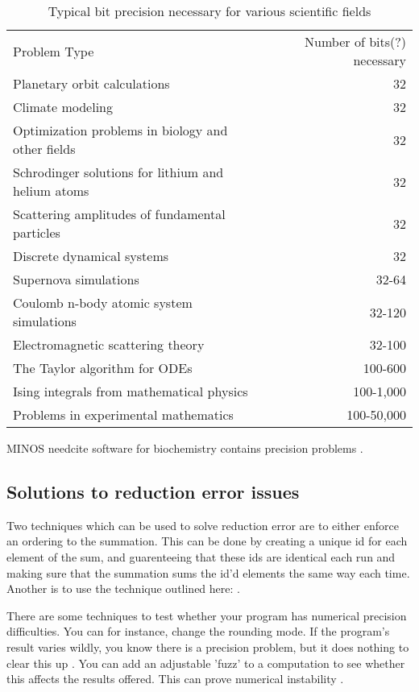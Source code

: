 \documentclass[american]{article}
\newcommand{\needcite}{
	\gls{needcite}
}
\begin{document}
\FloatBarrier
\begin{table}[t]
\caption{Typical bit precision necessary for various scientific fields}\label{tab:precision}
\begin{tabular}{lr}
Problem Type & Number of bits(?) necessary \\
Planetary orbit calculations & 32 \\
Climate modeling & 32 \\
Optimization problems in biology and other fields & 32\\
Schrodinger solutions for lithium and helium atoms & 32\\
Scattering amplitudes of fundamental particles & 32\\
Discrete dynamical systems & 32\\
Supernova simulations & 32-64 \\
Coulomb n-body atomic system simulations & 32-120\\
Electromagnetic scattering theory & 32-100\\
The Taylor algorithm for ODEs & 100-600\\
Ising integrals from mathematical physics & 100-1,000\\
Problems in experimental mathematics & 100-50,000\\
\end{tabular}
\end{table}
\FloatBarrier

MINOS \needcite software for biochemistry contains precision problems \cite{dhb-zurich-hp}.

\subsection{Solutions to reduction error issues} \label{sec:precision-solutions}

Two techniques which can be used to solve reduction error are to either enforce an ordering to the summation. This can be done by creating a unique id for each element of the sum, and guarenteeing that these ids are identical each run and making sure that the summation sums the id'd elements the same way each time. Another is to use the technique outlined here: \cite{repro-fast-sum}.

There are some techniques to test whether your program has numerical precision difficulties. You can for instance, change the rounding mode. If the program's result varies wildly, you know there is a precision problem, but it does nothing to clear this up \cite{dhb-numerical-bugs}. You can add an adjustable 'fuzz' to a computation to see whether this affects the results offered. This can prove numerical instability \cite{dhb-numerical-bugs}.
\end{document}
